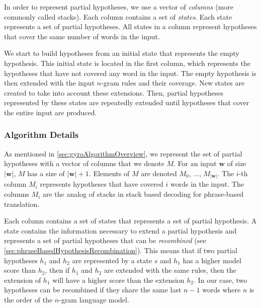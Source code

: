 In order to represent partial hypotheses, we use a vector
of \emph{columns} (more commonly called stacks). Each
column contains a set of
\emph{states}. Each state represents a set of partial hypotheses.
All states in a column represent hypotheses that cover
the same number of words in the input.

We start to build hypotheses from an initial state that
represents the empty hypothesis. This initial state
is located in the first column, which represents the
hypotheses that have not covered any word in the input.
The empty hypothesis is then extended with the input
$n$-gram rules and their coverage. New states are created
to take into account these extensions. Then, partial
hypotheses represented by these states are repeatedly
extended until hypotheses that cover the entire input
are produced.

\subsubsection{Algorithm Details}
\label{sec:gyroAlgoDetails}

As mentioned in \autoref{sec:gyroAlgorithmOverview}, we represent
the set of
partial hypotheses with a vector of columns that we denote
$M$. For an input $\bm{w}$ of size $|\bm{w}|$, $M$ has a size
of $|\bm{w}| + 1$. Elements of $M$ are denoted $M_0$, ..., $M_{|\bm{w}|}$.
The $i$-th column $M_i$ represents hypotheses that have covered
$i$ words in the input. The columns $M_i$ are the analog of stacks
in stack based decoding for phrase-based translation.

Each column contains a set of states that represents a set of partial
hypothesis. A state contains the information necessary to
extend a partial hypothesis and represents a set of
partial hypotheses that can
be \emph{recombined} (see \autoref{sec:phraseBasedHypothesisRecombination}).
This means that if two partial hypotheses $h_1$ and $h_2$
are represented by a state $s$ and $h_1$ has a higher model score than
$h_2$, then if $h_1$ and $h_2$ are extended with the same rules, then
the extension of $h_1$ will have a higher score than the extension $h_2$.
In our case, two hypotheses can be recombined if they share the same last
$n - 1$ words where $n$ is the order of the $n$-gram language model.

